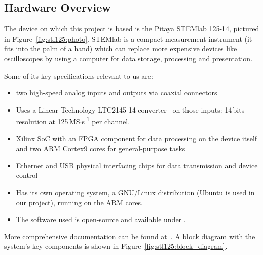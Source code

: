 \subsection{Hardware Overview} %
\label{subsec:stl125:hardware_overview}

The  device on  which this  project  is based  is the  Pitaya STEMlab  125-14,
pictured  in Figure~\ref{fig:stl125:photo}. STEMlab  is a  compact measurement
instrument (it fits into the palm of  a hand) which can replace more expensive
devices like  oscilloscopes by using  a computer for data  storage, processing
and presentation.

Some of its key specifications relevant to us are:
\begin{itemize}\tightlist
    \item
        two high-speed analog inputs and outputs via coaxial connectors
    \item
        Uses  a  Linear Technology  LTC2145-14  converter~\cite{lt:ltc2145-14}
        on      those      inputs:      \num{14}\,bits      resolution      at
        \num{125}\,MS$\cdot$s\textsuperscript{-1} per channel.
    \item
        Xilinx SoC  with an FPGA component  for data processing on  the device
        itself and two ARM Cortex9 cores for general-purpose tasks
    \item
        Ethernet and USB physical interfacing  chips for data transmission and
        device control
    \item
        Has its own operating system, a GNU/Linux distribution (Ubuntu is used
        in our project), running on the ARM cores.
    \item
        The software used is open-source and available under \cite{pita:github}.
\end{itemize}
More  comprehensive documentation  can be  found at~\cite{pita:readthedocs}. A
block   diagram   with    the   system's   key   components    is   shown   in
Figure~\ref{fig:stl125:block_diagram}.

